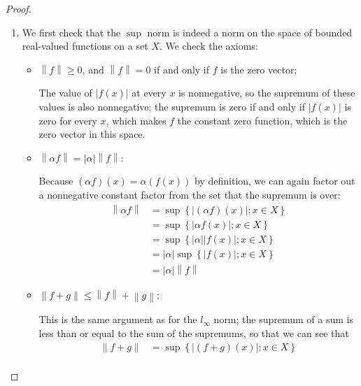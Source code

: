 \documentclass[12pt]{article}
\theoremstyle{definition}
\begin{document}
\begin{proof}
	\begin{enumerate}[label=(\roman*)]
		\item We first check that the $\sup$ norm is indeed a norm on the space of bounded real-valued functions on a set $X$. We check the axioms:
			\begin{itemize}
				\item $\left \lVert { f } \right \lVert \geq 0$, and $\left \lVert {  f } \right \lVert = 0 $ if and only if $f$ is the zero vector;
					\par The value of $\left \lvert { f(x) } \right \lvert $ at every $x$ is nonnegative, so the supremum of these values is also nonnegative; the supremum is zero if and only if $\left \lvert { f(x) } \right \lvert $ is zero for every $x$, which makes $f$ the constant zero function, which is the zero vector in this space.
				\item $\left \lVert { \alpha f } \right \lVert = \left \lvert { \alpha } \right \lvert \left \lVert { f } \right \lVert $: 
					\par Because $(\alpha f)(x) = \alpha (f(x))$ by definition, we can again factor out a nonnegative constant factor from the set that the supremum is over:
					\begin{align*}
						\left \lVert { \alpha f } \right \lVert &= \sup\left\{ \left \lvert { (\alpha f)(x) } \right \lvert ; x \in X \right\}\\
						&= \sup\left\{ \left \lvert { \alpha f(x) } \right \lvert ; x \in X \right\}\\
						&= \sup\left\{ \left \lvert { \alpha } \right \lvert \left \lvert { f(x) } \right \lvert ; x \in X \right\}\\
						&= \left \lvert { \alpha } \right \lvert \sup\left\{ \left \lvert { f(x) } \right \lvert ;x \in X \right\}\\
						&= \left \lvert { \alpha } \right \lvert \left \lVert { f } \right \lVert 
					\end{align*}
				\item $\left \lVert { f + g } \right \lVert \leq \left \lVert {  f } \right \lVert  + \left \lVert { g } \right \lVert $:
					\par This is the same argument as for the $l_\infty$ norm; the supremum of a sum is less than or equal to the sum of the supremums, so that we can see that
					\begin{align*}
						\left \lVert { f + g } \right \lVert &= \sup\left\{ \left \lvert { (f+g)(x) } \right \lvert ;x \in X \right\}\\

\end{align*}
\end{itemize}
\end{enumerate}
\end{proof}
\end{document}
